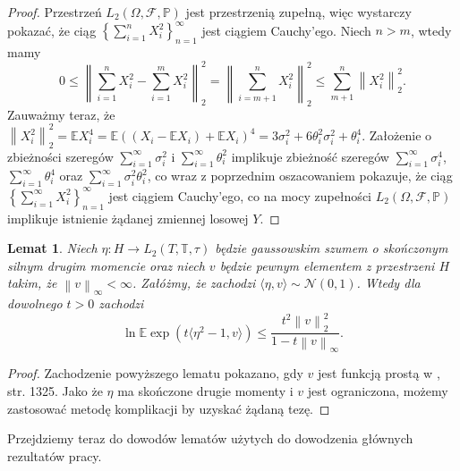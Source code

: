 \documentclass{mwart}
\newtheorem{lm}{Lemat}
\newcommand{\norm}[1]{\left\lVert#1\right\rVert}
\begin{document}
\begin{proof}
Przestrzeń $L_2(\Omega,\mathcal{F},\mathbb{P})$ jest przestrzenią zupełną, więc wystarczy pokazać, że ciąg $\left\{\sum_{i=1}^{n}X_i^2\right\}_{n=1}^{\infty}$ jest ciągiem Cauchy'ego. Niech $n>m$, wtedy mamy
\begin{displaymath}
0\leq \norm{\sum_{i=1}^{n}X_i^2-\sum_{i=1}^{m}X_i^2}_2^2=\norm{\sum_{i=m+1}^{n}X_i^2}_2^2\leq \sum_{m+1}^n\norm{X_i^2}_2^2.
\end{displaymath}
Zauważmy teraz, że $\norm{X_i^2}_2^2=\mathbb{E}X_i^4=\mathbb{E}\left((X_i-\mathbb{E}X_i)+\mathbb{E}X_i\right)^4=3\sigma_i^2+6\theta_i^2\sigma_i^2+\theta_i^4$. Założenie o zbieżności szeregów $\sum_{i=1}^{\infty}\sigma_i^2$ i $\sum_{i=1}^{\infty}\theta_i^2$ implikuje zbieżność szeregów $\sum_{i=1}^{\infty}\sigma_i^4$, $\sum_{i=1}^{\infty}\theta_i^4$ oraz $\sum_{i=1}^{\infty}\sigma_i^2\theta_i^2$, co wraz z poprzednim oszacowaniem pokazuje, że ciąg $\left\{\sum_{i=1}^{\infty}X_i^2\right\}_{n=1}^{\infty}$ jest ciągiem Cauchy'ego, co na mocy zupełności $L_2(\Omega,\mathcal{F},\mathbb{P})$ implikuje istnienie żądanej zmiennej losowej $Y$.
\end{proof}
\begin{lm}\label{szacowanie}
Niech $\eta\colon H\to L_2(T,\mathbb{T},\tau)$ będzie gaussowskim szumem o skończonym silnym drugim momencie oraz niech $v$ będzie pewnym elementem z przestrzeni $H$ takim, że $\norm{v}_{\infty}<\infty$. Załóżmy, że zachodzi $\langle \eta, v\rangle\sim \mathcal{N}(0,1)$. Wtedy dla dowolnego $t>0$ zachodzi
\begin{displaymath}
\ln\mathbb{E}\exp\left(t\langle \eta^2 -1,v\rangle\right)\leq \frac{t^2\norm{v}^2_2}{1-t\norm{v}_{\infty}}.
\end{displaymath}
\end{lm}
\begin{proof}
Zachodzenie powyższego lematu pokazano, gdy $v$ jest funkcją prostą w \cite{laurent}, str. 1325. Jako że $\eta$ ma skończone drugie momenty i $v$ jest ograniczona, możemy zastosować metodę komplikacji by uzyskać żądaną tezę.
\end{proof}
Przejdziemy teraz do dowodów lematów użytych do dowodzenia głównych rezultatów pracy.
\end{document}
